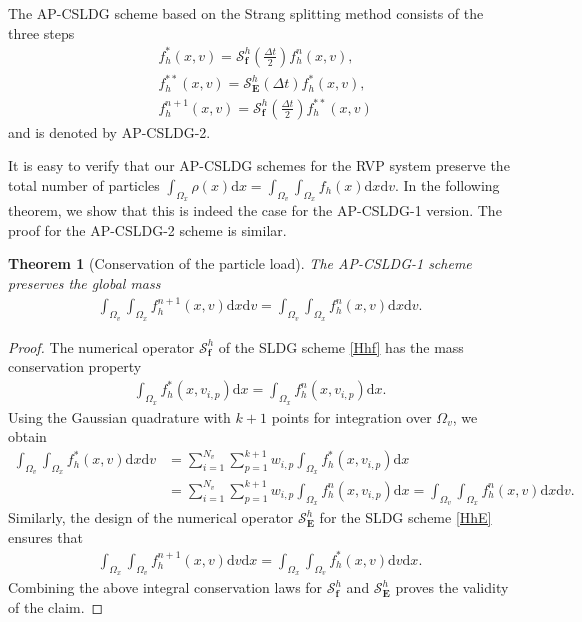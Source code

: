 \documentclass[letterpaper,10pt]{article}
\newtheorem{theorem}{Theorem}[section]
\numberwithin{equation}{section}
\numberwithin{figure}{section}
\numberwithin{table}{section}
\begin{document}
The AP-CSLDG scheme based on the Strang splitting method
consists of the three steps
\begin{align*}
    &f_h^{*}(x,v)=\mathcal{S}^{h}_{\mathbf{f}}(\frac{\Delta t}{2})f_h^n(x,v),\\
    &f_h^{**}(x,v)=\mathcal{S}^{h}_{\mathbf{E}}(\Delta t)f_h^{*}(x,v),\\
    &f_h^{n+1}(x,v)=\mathcal{S}^{h}_{\mathbf{f}}(\frac{\Delta t}{2})f_h^{**}(x,v)
\end{align*}
and is denoted by AP-CSLDG-2.

It is easy to verify that our AP-CSLDG schemes for the RVP system
preserve the total number of particles
$\int_{\Omega_x}\rho(x)\mathrm dx=
\int_{\Omega_v}\int_{\Omega_x} f_h(x)\mathrm d x\mathrm d v$.
In the following theorem, we show that this is indeed the case
for the AP-CSLDG-1 version. The proof for the AP-CSLDG-2 scheme is similar.
\begin{theorem}[Conservation of the particle load] The AP-CSLDG-1 scheme preserves the global mass
    \begin{align*}
        \int_{\Omega_v}\int_{\Omega_x} f_h^{n+1}(x,v)\mathrm d x\mathrm d v=\int_{\Omega_v}\int_{\Omega_x} f_h^n(x,v)\mathrm d x\mathrm d v.
    \end{align*}
\end{theorem}
\begin{proof}
   The numerical operator $\mathcal{S}_{\mathbf{f}}^h$
   of the SLDG scheme \eqref{Hhf} has the mass conservation property
    \begin{align*}
        \int_{\Omega_x} f_h^{*}(x,v_{i,p})\mathrm d x=\int_{\Omega_x} f_h^n(x,v_{i,p})\mathrm d x.
    \end{align*}
Using the Gaussian quadrature with $k+1$ points for integration
over $\Omega_v$, we obtain
    \begin{align*}
        \int_{\Omega_v}\int_{\Omega_x} f_h^{*}(x,v)\mathrm d x\mathrm d v &=\sum_{i=1}^{N_v}\sum_{p=1}^{k+1} w_{i,p} \int_{\Omega_x} f_h^{*}(x,v_{i,p})\mathrm d x\\
        &=\sum_{i=1}^{N_v}\sum_{p=1}^{k+1} w_{i,p} \int_{\Omega_x} f_h^{n}(x,v_{i,p})\mathrm d x
        =\int_{\Omega_v}\int_{\Omega_x} f_h^{n}(x,v)\mathrm d x\mathrm d v.
    \end{align*}
    Similarly, the design of
    the numerical operator $\mathcal{S}_{\mathbf{E}}^h$ for
    the SLDG scheme \eqref{HhE} ensures that
    \begin{align*}
        \int_{\Omega_x}\int_{\Omega_v} f_h^{n+1}(x,v)\mathrm d v\mathrm d x=\int_{\Omega_x}\int_{\Omega_v} f_h^{*}(x,v)\mathrm d v\mathrm d x.
    \end{align*}
    Combining the above integral conservation laws for $\mathcal{S}_{\mathbf{f}}^h$
    and $\mathcal{S}_{\mathbf{E}}^h$
    proves the validity of the claim.
\end{proof}
\end{document}
